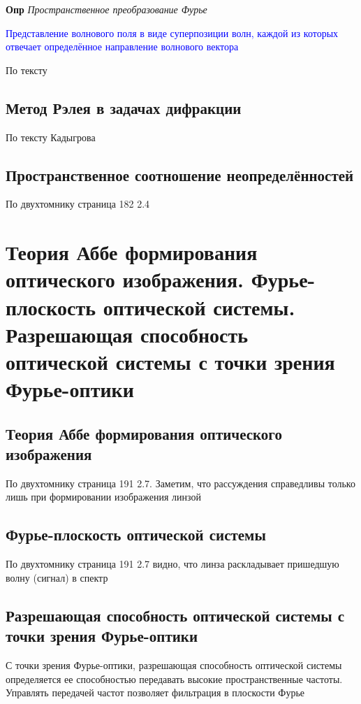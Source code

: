 \documentclass[a4paper, 14pt]{article}
\begin{document}
    \textbf{Опр} \textit{Пространственное преобразование Фурье}
    
    \textcolor{blue}{Представление волнового поля в виде суперпозиции волн, каждой из которых отвечает определённое
    направление волнового вектора}
    
    По тексту
    
    \subsection{Метод Рэлея в задачах дифракции}
    
    По тексту Кадыгрова
    
    \subsection{Пространственное соотношение неопределённостей}
    
    По двухтомнику страница 182 2.4
    
    \section{Теория Аббе формирования оптического изображения.
    Фурье-плоскость оптической системы.
    Разрешающая способность оптической системы с точки зрения Фурье-оптики}
    
    \subsection{Теория Аббе формирования оптического изображения}
    
    По двухтомнику страница 191 2.7.
    Заметим, что рассуждения справедливы только лишь при формировании изображения линзой
    
    \subsection{Фурье-плоскость оптической системы}
    
    По двухтомнику страница 191 2.7 видно, что линза раскладывает пришедшую волну (сигнал) в спектр
    
    \subsection{Разрешающая способность оптической системы с точки зрения Фурье-оптики}
    
    С точки зрения Фурье-оптики, разрешающая способность оптической системы определяется ее способностью передавать
    высокие пространственные частоты.
    Управлять передачей частот позволяет фильтрация в плоскости Фурье
    
\end{document}
